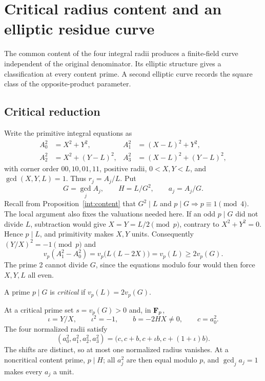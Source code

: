 \section{Critical radius content and an elliptic residue curve}\label{sec:critical-content}

The common content of the four integral radii produces a finite-field
curve independent of the original denominator. Its elliptic structure
gives a classification at every content prime. A second elliptic curve
records the square class of the opposite-product parameter.

\subsection{Critical reduction}

Write the primitive integral equations as
\begin{equation}\label{crit:integral}
\begin{aligned}
 A_0^2&=X^2+Y^2,& A_1^2&=(X-L)^2+Y^2,\\
 A_2^2&=X^2+(Y-L)^2,& A_3^2&=(X-L)^2+(Y-L)^2,
\end{aligned}
\end{equation}
with corner order \(00,10,01,11\), positive radii, \(0<X,Y<L\),
and \(\gcd(X,Y,L)=1\). Thus \(r_j=A_j/L\). Put
\[
 G=\gcd_j A_j,\qquad H=L/G^2,\qquad a_j=A_j/G.
\]
Recall from Proposition~\ref{int:content} that \(G^2\mid L\) and
\(p\mid G\Rightarrow p\equiv1\pmod4\). The local argument also
fixes the valuations needed here. If an odd \(p\mid G\) did not
divide \(L\), subtraction would give \(X=Y=L/2\pmod p\), contrary
to \(X^2+Y^2=0\). Hence \(p\mid L\), and primitivity makes
\(X,Y\) units. Consequently \((Y/X)^2=-1\pmod p\) and
\[
 v_p(A_1^2-A_0^2)=v_p\bigl(L(L-2X)\bigr)=v_p(L)\ge2v_p(G).
\]
The prime 2 cannot divide \(G\), since the equations modulo four
would then force \(X,Y,L\) all even.

\begin{definition}
A prime \(p\mid G\) is \emph{critical} if \(v_p(L)=2v_p(G)\).
\end{definition}

At a critical prime set \(s=v_p(G)>0\) and, in \(\mathbf F_p\),
\[
 \iota=Y/X,\qquad\iota^2=-1,\qquad b=-2HX\ne0,\qquad c=a_0^2.
\]
The four normalized radii satisfy
\begin{equation}\label{crit:pattern}
 (a_0^2,a_1^2,a_2^2,a_3^2)
 =\bigl(c,c+b,c+\iota b,c+(1+\iota)b\bigr).
\end{equation}
The shifts are distinct, so at most one normalized radius vanishes.
At a noncritical content prime, \(p\mid H\); all \(a_j^2\) are then
equal modulo \(p\), and \(\gcd_j a_j=1\) makes every \(a_j\) a unit.

